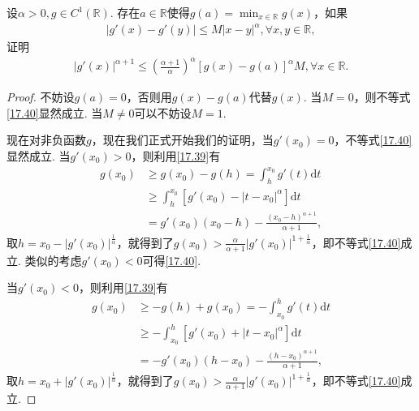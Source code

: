 \documentclass[../../main.tex]{subfiles}
\begin{document}
\begin{lemma}\label{lemma:g'(x)的Hölder连续相关结论}
设$\alpha>0, g\in C^1(\mathbb{R})$. 存在$a\in\mathbb{R}$使得$g(a)=\min_{x\in\mathbb{R}}g(x)$，如果
\begin{align}
|g'(x) - g'(y)| \leqslant M|x - y|^{\alpha}, \forall x,y\in\mathbb{R}, \label{17.39}
\end{align}
证明
\begin{align}
|g'(x)|^{\alpha + 1} \leqslant \left(\frac{\alpha + 1}{\alpha}\right)^{\alpha}[g(x) - g(a)]^{\alpha}M, \forall x\in\mathbb{R}. \label{17.40}
\end{align}
\end{lemma}
\begin{proof}
不妨设$g(a)=0$，否则用$g(x) - g(a)$代替$g(x)$. 当$M = 0$，则不等式\eqref{17.40}显然成立. 当$M\neq0$可以不妨设$M = 1$.

现在对非负函数$g$，现在我们正式开始我们的证明，当$g'(x_0)=0$，不等式\eqref{17.40}显然成立. 当$g'(x_0)>0$，则利用\eqref{17.39}有
\begin{align*}
g(x_0) &\geqslant g(x_0) - g(h)=\int_{h}^{x_0}g'(t)\mathrm{d}t \\
&\geqslant \int_{h}^{x_0}[g'(x_0) - |t - x_0|^{\alpha}]\mathrm{d}t \\
&= g'(x_0)(x_0 - h)-\frac{(x_0 - h)^{\alpha + 1}}{\alpha + 1},
\end{align*}
取$h = x_0 - |g'(x_0)|^{\frac{1}{\alpha}}$，就得到了$g(x_0)>\frac{\alpha}{\alpha + 1}|g'(x_0)|^{1 + \frac{1}{\alpha}}$，即不等式\eqref{17.40}成立. 类似的考虑$g'(x_0)<0$可得\eqref{17.40}.

当$g'(x_0)<0$，则利用\eqref{17.39}有
\begin{align*}
g(x_0) &\geqslant -g(h) + g(x_0)=-\int_{x_0}^{h}g'(t)\mathrm{d}t \\
&\geqslant -\int_{x_0}^{h}[g'(x_0) + |t - x_0|^{\alpha}]\mathrm{d}t \\
&= -g'(x_0)(h - x_0)-\frac{(h - x_0)^{\alpha + 1}}{\alpha + 1},
\end{align*}
取$h = x_0 + |g'(x_0)|^{\frac{1}{\alpha}}$，就得到了$g(x_0)>\frac{\alpha}{\alpha + 1}|g'(x_0)|^{1 + \frac{1}{\alpha}}$，即不等式\eqref{17.40}成立. 

\end{proof}
\end{document}
